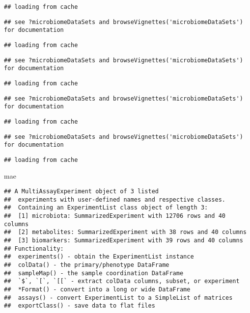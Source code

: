 \documentclass[
  oneside]{book}
\newenvironment{Shaded}{\begin{snugshade}}{\end{snugshade}}
\newcommand{\NormalTok}[1]{#1}
\begin{document}
\begin{verbatim}
## loading from cache
\end{verbatim}

\begin{verbatim}
## see ?microbiomeDataSets and browseVignettes('microbiomeDataSets') for documentation
\end{verbatim}

\begin{verbatim}
## loading from cache
\end{verbatim}

\begin{verbatim}
## see ?microbiomeDataSets and browseVignettes('microbiomeDataSets') for documentation
\end{verbatim}

\begin{verbatim}
## loading from cache
\end{verbatim}

\begin{verbatim}
## see ?microbiomeDataSets and browseVignettes('microbiomeDataSets') for documentation
\end{verbatim}

\begin{verbatim}
## loading from cache
\end{verbatim}

\begin{verbatim}
## see ?microbiomeDataSets and browseVignettes('microbiomeDataSets') for documentation
\end{verbatim}

\begin{verbatim}
## loading from cache
\end{verbatim}

\begin{Shaded}
\begin{Highlighting}[]
\NormalTok{mae}
\end{Highlighting}
\end{Shaded}

\begin{verbatim}
## A MultiAssayExperiment object of 3 listed
##  experiments with user-defined names and respective classes.
##  Containing an ExperimentList class object of length 3:
##  [1] microbiota: SummarizedExperiment with 12706 rows and 40 columns
##  [2] metabolites: SummarizedExperiment with 38 rows and 40 columns
##  [3] biomarkers: SummarizedExperiment with 39 rows and 40 columns
## Functionality:
##  experiments() - obtain the ExperimentList instance
##  colData() - the primary/phenotype DataFrame
##  sampleMap() - the sample coordination DataFrame
##  `$`, `[`, `[[` - extract colData columns, subset, or experiment
##  *Format() - convert into a long or wide DataFrame
##  assays() - convert ExperimentList to a SimpleList of matrices
##  exportClass() - save data to flat files
\end{verbatim}
\end{document}
